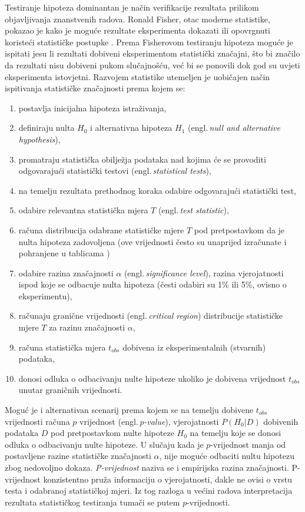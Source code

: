 Testiranje hipoteza dominantan je način verifikacije rezultata prilikom objavljivanja znanstvenih radova. Ronald Fisher, otac moderne statistike, pokazao je kako je moguće rezultate eksperimenta dokazati ili opovrgnuti koristeći statističke postupke \citep{fisher1922mathematical}. Prema Fisherovom testiranju hipoteza moguće je ispitati jesu li rezultati dobiveni eksperimentom statistički značajni, što bi značilo da rezultati nisu dobiveni pukom slučajnošću, već bi se ponovili dok god su uvjeti eksperimenta istovjetni. Razvojem statistike utemeljen je uobičajen način ispitivanja statističke značajnosti prema kojem se:

\begin{enumerate}
\item postavlja inicijalna hipoteza istraživanja,
\item definiraju nulta $H_0$ i alternativna hipoteza $H_1$ (engl.\,\textit{null and alternative hypothesis}),
\item promatraju statistička obilježja podataka nad kojima će se provoditi odgovarajući statistički testovi (engl.\,\textit{statistical tests}),
\item na temelju rezultata prethodnog koraka odabire odgovarajući statistički test,
\item odabire relevantna statistička mjera $T$ (engl.\,\textit{test statistic}),
\item računa distribucija odabrane statističke mjere $T$ pod pretpostavkom da je nulta hipoteza zadovoljena (ove vrijednosti često su unaprijed izračunate i pohranjene u tablicama \citep{wilcoxon1973critical})
\item odabire razina značajnosti $\alpha$ (engl.\,\textit{significance level}), razina vjerojatnosti ispod koje se odbacuje nulta hipoteza (česti odabiri su 1\% ili 5\%, ovisno o eksperimentu),
\item računaju granične vrijednosti (engl.\,\textit{critical region}) distribucije statističke mjere $T$ za razinu značajnosti $\alpha$,
\item računa statistička mjera $t_{obs}$ dobivena iz eksperimentalnih (stvarnih) podataka,
\item donosi odluka o odbacivanju nulte hipoteze ukoliko je dobivena vrijednost $t_{obs}$ unutar graničnih vrijednosti.
\end{enumerate}

Moguć je i alternativan scenarij prema kojem se na temelju dobivene $t_{obs}$ vrijednosti računa $p$ vrijednost (engl.\,\textit{p-value}), vjerojatnosti $P(H_0|D)$ dobivenih podataka $D$ pod pretpostavkom nulte hipoteze $H_0$ na temelju koje se donosi odluka o odbacivanju nulte hipoteze. U slučaju kada je $p$-vrijednost manja od postavljene razine statističke značajnosti $\alpha$, nije moguće odbaciti nultu hipotezu zbog nedovoljno dokaza. \textit{P-vrijednost} naziva se i empirijska razina značajnosti. P-vrijednost konzistentno pruža informaciju o vjerojatnosti, dakle ne ovisi o vrstu testa i odabranoj statističkoj mjeri. Iz tog razloga u većini radova interpretacija rezultata statističkog testiranja tumači se putem $p$-vrijednosti. 

